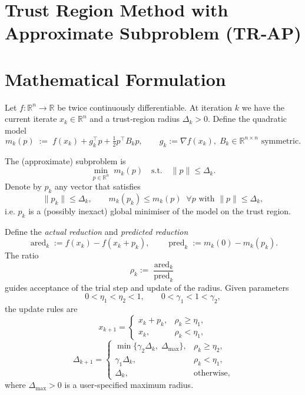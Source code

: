 \documentclass{article}
\begin{document}
\section*{Trust Region Method with Approximate Subproblem (TR‑AP)}

\section*{Mathematical Formulation}
Let $f:\mathbb{R}^{n}\rightarrow\mathbb{R}$ be twice continuously differentiable.
At iteration $k$ we have the current iterate $x_{k}\in\mathbb{R}^{n}$ and a
trust‑region radius $\Delta_{k}>0$.
Define the quadratic model
\[
m_{k}(p)\;:=\;f(x_{k})+g_{k}^{\top}p+\tfrac12 p^{\top}B_{k}p,
\qquad 
g_{k}:=\nabla f(x_{k}),\; B_{k}\in\mathbb{R}^{n\times n}\text{ symmetric}.
\]

The (approximate) subproblem is
\[
\min_{p\in\mathbb{R}^{n}}\; m_{k}(p)\quad\text{s.t.}\quad\|p\|\le \Delta_{k}.
\tag{TR}
\]
Denote by $p_{k}$ any vector that satisfies
\[
\|p_{k}\|\le\Delta_{k},\qquad 
m_{k}(p_{k})\le m_{k}(p)\;\;\forall p\text{ with }\|p\|\le\Delta_{k},
\tag{1}
\]
i.e. $p_{k}$ is a (possibly inexact) global minimiser of the model on the
trust region.

Define the \emph{actual reduction} and \emph{predicted reduction}
\[
\operatorname{ared}_{k}:=f(x_{k})-f(x_{k}+p_{k}),\qquad
\operatorname{pred}_{k}:=m_{k}(0)-m_{k}(p_{k}).
\]
The ratio
\[
\rho_{k}:=\frac{\operatorname{ared}_{k}}{\operatorname{pred}_{k}}
\tag{2}
\]
guides acceptance of the trial step and update of the radius.
Given parameters
\[
0<\eta_{1}<\eta_{2}<1,\qquad 0<\gamma_{1}<1<\gamma_{2},
\]
the update rules are
\[
x_{k+1}= 
\begin{cases}
x_{k}+p_{k}, & \rho_{k}\ge \eta_{1},\\[2mm]
x_{k}, & \rho_{k}<\eta_{1},
\end{cases}
\tag{3}
\]
\[
\Delta_{k+1}= 
\begin{cases}
\min\{\gamma_{2}\Delta_{k},\;\Delta_{\max}\}, & \rho_{k}\ge \eta_{2},\\[2mm]
\gamma_{1}\Delta_{k}, & \rho_{k}<\eta_{1},\\[2mm]
\Delta_{k}, & \text{otherwise},
\end{cases}
\tag{4}
\]
where $\Delta_{\max}>0$ is a user‑specified maximum radius.
\end{document}
